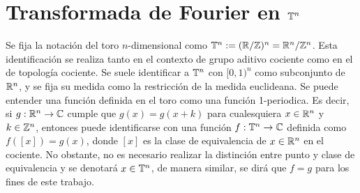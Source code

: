 \section{Transformada de Fourier en $\mathbb{T}^n$}
Se fija la notación del toro $n$-dimensional como $\mathbb{T}^n:=(\mathbb{R}/\mathbb{Z})^n = \mathbb{R}^n/\mathbb{Z}^n$. Esta identificación se realiza tanto en el contexto de grupo aditivo cociente como en el de topología cociente. Se suele identificar a $\mathbb{T}^n$ con $[0, 1)^n$ como subconjunto de $\mathbb{R}^n$, y se fija su medida como la restricción de la medida euclideana. Se puede entender una función definida en el toro como una función 1-periodica. Es decir, si $g:\mathbb{R}^n\rightarrow\mathbb{C}$ cumple que $g(x)=g(x+k)$ para cualesquiera $x\in\mathbb{R}^n$ y $k\in\mathbb{Z}^n$, entonces puede identificarse con una función $f:\mathbb{T}^n\rightarrow\mathbb{C}$ definida como $f([x]) = g(x)$, donde $[x]$ es la clase de equivalencia de $x\in\mathbb{R}^n$ en el cociente. No obstante, no es necesario realizar la distinción entre punto y clase de equivalencia y se denotará $x\in\mathbb{T}^n$, de manera similar, se dirá que $f=g$ para los fines de este trabajo. 

